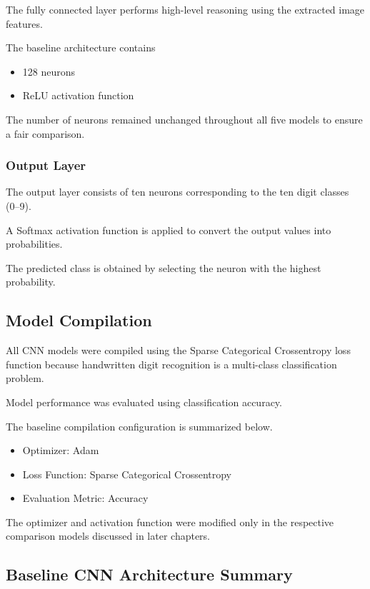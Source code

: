 The fully connected layer performs high-level reasoning using the extracted image features.

The baseline architecture contains

\begin{itemize}
    \item 128 neurons
    \item ReLU activation function
\end{itemize}

The number of neurons remained unchanged throughout all five models to ensure a fair comparison.

\subsubsection{Output Layer}

The output layer consists of ten neurons corresponding to the ten digit classes (0--9).

A Softmax activation function is applied to convert the output values into probabilities.

The predicted class is obtained by selecting the neuron with the highest probability.

\subsection{Model Compilation}

All CNN models were compiled using the Sparse Categorical Crossentropy loss function because handwritten digit recognition is a multi-class classification problem.

Model performance was evaluated using classification accuracy.

The baseline compilation configuration is summarized below.

\begin{itemize}
    \item Optimizer: Adam
    \item Loss Function: Sparse Categorical Crossentropy
    \item Evaluation Metric: Accuracy
\end{itemize}

The optimizer and activation function were modified only in the respective comparison models discussed in later chapters.

\subsection{Baseline CNN Architecture Summary}

